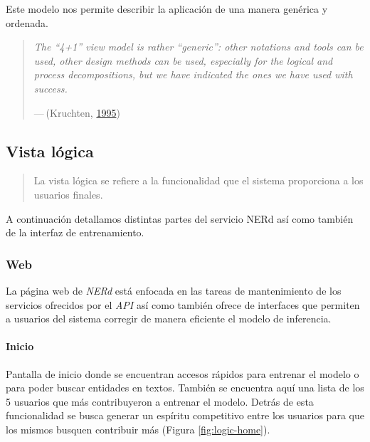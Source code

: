 \documentclass[12pt,a4paper,]{scrartcl}
\let\oldparagraph\paragraph
\renewcommand{\paragraph}[1]{\oldparagraph{#1}\mbox{}}
\begin{document}
Este modelo nos permite describir la aplicación de una manera genérica y ordenada.

\begin{quote}
\emph{The \enquote{4+1} view model is rather \enquote{generic}: other notations and tools can be used, other design methods can be used, especially for the logical and process decompositions, but we have indicated the ones we have used with success.}

\hfill --- (Kruchten, \protect\hyperlink{ref-Kruchten:1995:VMA:624610.625529}{1995})
\end{quote}

\hypertarget{vista-luxf3gica}{%
\subsection{Vista lógica}\label{vista-luxf3gica}}

\begin{quote}
La vista lógica se refiere a la funcionalidad que el sistema proporciona a los usuarios finales.
\end{quote}

A continuación detallamos distintas partes del servicio NERd así como también de la interfaz de entrenamiento.

\hypertarget{web}{%
\subsubsection{Web}\label{web}}

La página web de \emph{NERd} está enfocada en las tareas de mantenimiento de los servicios ofrecidos por el \emph{API} así como también ofrece de interfaces que permiten a usuarios del sistema corregir de manera eficiente el modelo de inferencia.

\hypertarget{inicio}{%
\paragraph{Inicio}\label{inicio}}

Pantalla de inicio donde se encuentran accesos rápidos para entrenar el modelo o para poder buscar entidades en textos.
También se encuentra aquí una lista de los 5 usuarios que más contribuyeron a entrenar el modelo. Detrás de esta funcionalidad se busca generar un espíritu competitivo entre los usuarios para que los mismos busquen contribuir más (Figura \ref{fig:logic-home}).
\end{document}
